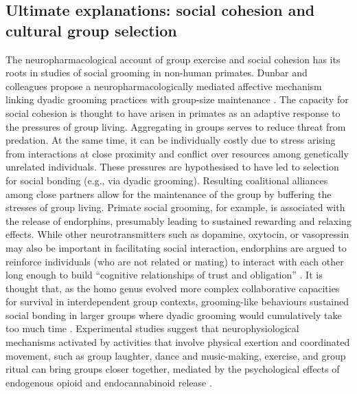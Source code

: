 
\subsection{Ultimate explanations: social cohesion and cultural group selection}
The neuropharmacological account of group exercise and social cohesion has its roots in studies of social grooming in non-human primates.  Dunbar and colleagues propose a neuropharmacologically mediated affective mechanism linking dyadic grooming practices with group-size maintenance \citep{Machin2011}.  The capacity for social cohesion is thought to have arisen in primates as an adaptive response to the pressures of group living.  Aggregating in groups serves to reduce threat from predation.  At the same time, it can be individually costly due to stress arising from interactions at close proximity and conflict over resources among genetically unrelated individuals.  These pressures are hypothesised to have led to selection for social bonding (e.g., via dyadic grooming). Resulting coalitional alliances among close partners allow for the maintenance of the group by buffering the stresses of group living.  Primate social grooming, for example, is associated with the release of endorphins, presumably leading to sustained rewarding and relaxing effects.  While other neurotransmitters such as dopamine, oxytocin, or vasopressin may also be important in facilitating social interaction, endorphins are argued to reinforce individuals (who are not related or mating) to interact with each other long enough to build ``cognitive relationships of trust and obligation'' \citep[1839]{Dunbar2012}.  It is thought that, as the homo genus evolved more complex collaborative capacities for survival in interdependent group contexts, grooming-like behaviours sustained social bonding in larger groups where dyadic grooming would cumulatively take too much time \citep{Dunbar2012}.  Experimental studies suggest that neurophysiological mechanisms activated by activities that involve physical exertion and coordinated movement, such as group laughter, dance and music-making, exercise, and group ritual can bring groups closer together, mediated by the psychological effects of endogenous opioid and endocannabinoid release \citep{Cohen2009,Fischer2014a,Fischer2014,Sullivan2014,Tarr2016,Tarr2015}.

